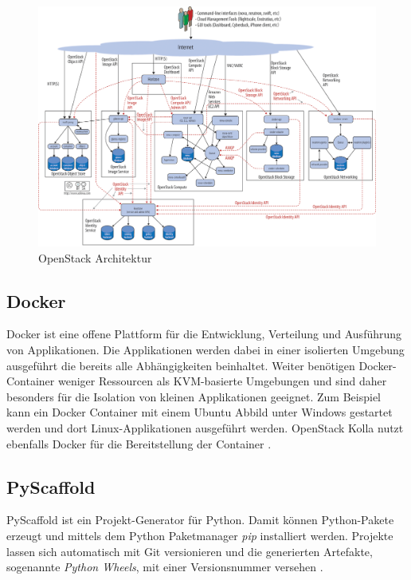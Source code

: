 \documentclass[../Main.tex]{subfiles}
\begin{document}
\begin{figure}[h]
    \centering
    \includegraphics[width=0.9\columnwidth]{Images/OpenstackArchitecture.png}
    \caption{OpenStack Architektur \citep{OpenStackArchitecture}}
\end{figure}

\subsection{Docker}
Docker ist eine offene Plattform für die Entwicklung, Verteilung und Ausführung von Applikationen. Die Applikationen werden dabei in einer isolierten
Umgebung ausgeführt die bereits alle Abhängigkeiten beinhaltet. Weiter benötigen Docker-Container weniger Ressourcen
als KVM-basierte Umgebungen und sind daher besonders für die Isolation von kleinen Applikationen geeignet.
Zum Beispiel kann ein Docker Container mit einem Ubuntu Abbild unter Windows gestartet werden und dort Linux-Applikationen ausgeführt werden.
OpenStack Kolla nutzt ebenfalls Docker für die Bereitstellung der Container \citep{Docker}.

\subsection{PyScaffold}
PyScaffold ist ein Projekt-Generator für Python. Damit können Python-Pakete erzeugt und mittels dem Python Paketmanager \textit{pip} installiert werden.
Projekte lassen sich automatisch mit Git versionieren und die generierten Artefakte, sogenannte \textit{Python Wheels}, mit einer Versionsnummer versehen \citep{PyScaffold}.



\biblio %
\end{document}
